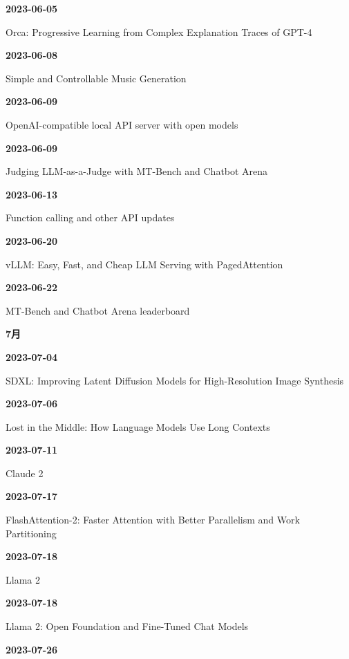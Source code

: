 \smallskip
\noindent\textbf{2023-06-05}\par
{\raggedright Orca: Progressive Learning from Complex Explanation Traces of GPT-4\par}
\smallskip
\noindent\textbf{2023-06-08}\par
{\raggedright Simple and Controllable Music Generation\par}
\smallskip
\noindent\textbf{2023-06-09}\par
{\raggedright OpenAI-compatible local API server with open models\par}
\smallskip
\noindent\textbf{2023-06-09}\par
{\raggedright Judging LLM-as-a-Judge with MT-Bench and Chatbot Arena\par}
\smallskip
\noindent\textbf{2023-06-13}\par
{\raggedright Function calling and other API updates\par}
\smallskip
\noindent\textbf{2023-06-20}\par
{\raggedright vLLM: Easy, Fast, and Cheap LLM Serving with PagedAttention\par}
\smallskip
\noindent\textbf{2023-06-22}\par
{\raggedright MT-Bench and Chatbot Arena leaderboard\par}
\smallskip
\medskip
\noindent\textbf{7月}\par
\smallskip
\noindent\textbf{2023-07-04}\par
{\raggedright SDXL: Improving Latent Diffusion Models for High-Resolution Image Synthesis\par}
\smallskip
\noindent\textbf{2023-07-06}\par
{\raggedright Lost in the Middle: How Language Models Use Long Contexts\par}
\smallskip
\noindent\textbf{2023-07-11}\par
{\raggedright Claude 2\par}
\smallskip
\noindent\textbf{2023-07-17}\par
{\raggedright FlashAttention-2: Faster Attention with Better Parallelism and Work Partitioning\par}
\smallskip
\noindent\textbf{2023-07-18}\par
{\raggedright Llama 2\par}
\smallskip
\noindent\textbf{2023-07-18}\par
{\raggedright Llama 2: Open Foundation and Fine-Tuned Chat Models\par}
\smallskip
\noindent\textbf{2023-07-26}\par
